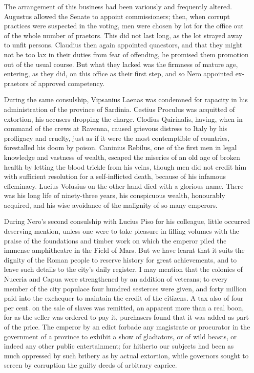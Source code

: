 
The arrangement of this business had been variously and frequently altered. Augustus allowed the Senate to appoint commissioners; then, when corrupt practices were suspected in the voting, men were chosen by lot for the office out of the whole number of praetors. This did not last long, as the lot strayed away to unfit persons. Claudius then again appointed quaestors, and that they might not be too lax in their duties from fear of offending, he promised them promotion out of the usual course. But what they lacked was the firmness of mature age, entering, as they did, on this office as their first step, and so Nero appointed ex-praetors of approved competency.


During the same consulship, Vipsanius Laenas was condemned for rapacity in his administration of the province of Sardinia. Cestius Proculus was acquitted of extortion, his accusers dropping the charge. Clodius Quirinalis, having, when in command of the crews at Ravenna, caused grievous distress to Italy by his profligacy and cruelty, just as if it were the most contemptible of countries, forestalled his doom by poison. Caninius Rebilus, one of the first men in legal knowledge and vastness of wealth, escaped the miseries of an old age of broken health by letting the blood trickle from his veins, though men did not credit him with sufficient resolution for a self-inflicted death, because of his infamous effeminacy. Lucius Volusius on the other hand died with a glorious name. There was his long life of ninety-three years, his conspicuous wealth, honourably acquired, and his wise avoidance of the malignity of so many emperors.


During Nero's second consulship with Lucius Piso for his colleague, little occurred deserving mention, unless one were to take pleasure in filling volumes with the praise of the foundations and timber work on which the emperor piled the immense amphitheatre in the Field of Mars. But we have learnt that it suits the dignity of the Roman people to reserve history for great achievements, and to leave such details to the city's daily register. I may mention that the colonies of Nuceria and Capua were strengthened by an addition of veterans; to every member of the city populace four hundred sesterces were given, and forty million paid into the exchequer to maintain the credit of the citizens. A tax also of four per cent. on the sale of slaves was remitted, an apparent more than a real boon, for as the seller was ordered to pay it, purchasers found that it was added as part of the price. The emperor by an edict forbade any magistrate or procurator in the government of a province to exhibit a show of gladiators, or of wild beasts, or indeed any other public entertainment; for hitherto our subjects had been as much oppressed by such bribery as by actual extortion, while governors sought to screen by corruption the guilty deeds of arbitrary caprice.

